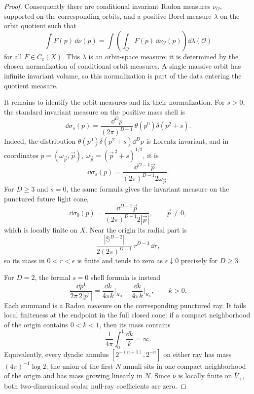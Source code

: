 \begin{proof}
Consequently there are conditional invariant Radon measures
\(\nu_{\mathcal O}\), supported on the corresponding orbits, and a positive
Borel measure \(\lambda\) on the orbit quotient such that
\[
  \int F(p)\,\dd\nu(p)
  =
  \int
  \left(\int_{\mathcal O}F(p)\,\dd\nu_{\mathcal O}(p)\right)
  \dd\lambda(\mathcal O)
\]
for all \(F\in C_c(X)\).  This \(\lambda\) is an orbit-space measure; it is
determined by the chosen normalization of conditional orbit measures.  A
single massive orbit has infinite invariant volume, so this normalization is
part of the data entering the quotient measure.

It remains to identify the orbit measures and fix their normalization.  For
\(s>0\), the standard invariant measure on the positive mass shell is
\[
  \dd\sigma_s(p)
  =
  \frac{\dd^Dp}{(2\pi)^{D-1}}\,
  \theta(p^0)\delta(p^2+s).
\]
Indeed, the distribution \(\theta(p^0)\delta(p^2+s)\dd^Dp\) is Lorentz
invariant, and in coordinates \(p=(\omega_{\vec p},\vec p)\),
\(\omega_{\vec p}=(\vec p^{\,2}+s)^{1/2}\), it is
\[
  \dd\sigma_s(p)
  =
  \frac{\dd^{D-1}\vec p}{(2\pi)^{D-1}2\omega_{\vec p}} .
\]
For \(D\ge3\) and \(s=0\), the same formula gives the invariant measure on the
punctured future light cone,
\[
  \dd\sigma_0(p)
  =
  \frac{\dd^{D-1}\vec p}{(2\pi)^{D-1}2|\vec p|},
  \qquad \vec p\ne0,
\]
which is locally finite on \(X\).  Near the origin its radial part is
\[
  \frac{|\mathbb S^{D-2}|}{2(2\pi)^{D-1}}\,r^{D-3}\,\dd r ,
\]
so its mass in \(0<r<\epsilon\) is finite and tends to zero as
\(\epsilon\downarrow0\) precisely for \(D\ge3\).

For \(D=2\), the formal \(s=0\) shell formula is instead
\[
  \frac{\dd p^1}{2\pi\,2|p^1|}
  =
  \frac{\dd k}{4\pi k}\Big|_{R_{\mathrm R}}
  +
  \frac{\dd k}{4\pi k}\Big|_{R_{\mathrm L}},
  \qquad k>0.
\]
Each summand is a Radon measure on the corresponding punctured ray.  It fails
local finiteness at the endpoint in the full closed cone: if a compact
neighborhood of the origin contains \(0<k<1\), then its mass contains
\[
  \frac1{4\pi}\int_0^1\frac{\dd k}{k}=\infty .
\]
Equivalently, every dyadic annulus
\([2^{-(n+1)},2^{-n}]\) on either ray has mass
\((4\pi)^{-1}\log2\); the union of the first \(N\) annuli sits in one compact
neighborhood of the origin and has mass growing linearly in \(N\).  Since
\(\nu\) is locally finite on \(\overline V_+\), both two-dimensional scalar
null-ray coefficients are zero.


\end{proof}
